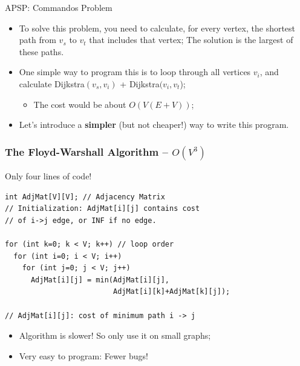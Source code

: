 \begin{frame}{APSP: Commandos Problem}
  \begin{itemize}
  \item To solve this problem, you need to calculate, for every vertex, the shortest path from $v_s$ to $v_t$ that includes that vertex; The solution is the largest of these paths.\bigskip

  \item One simple way to program this is to loop through all vertices $v_i$, and calculate Dijkstra$(v_s,v_i)$ + Dijkstra$(v_i,v_t$);
  \begin{itemize}
    \item The cost would be about $O(V(E+V))$;
  \end{itemize}\bigskip

  \item Let's introduce a {\bf simpler} (but not cheaper!) way to write this program.
  \end{itemize}
\end{frame}

\begin{frame}[fragile]
  \frametitle{The Floyd-Warshall Algorithm -- $O(V^3)$}

Only four lines of code!

  \begin{exampleblock}{}
\begin{verbatim}
int AdjMat[V][V]; // Adjacency Matrix
// Initialization: AdjMat[i][j] contains cost
// of i->j edge, or INF if no edge.

for (int k=0; k < V; k++) // loop order
  for (int i=0; i < V; i++)
    for (int j=0; j < V; j++)
      AdjMat[i][j] = min(AdjMat[i][j],
                         AdjMat[i][k]+AdjMat[k][j]);

// AdjMat[i][j]: cost of minimum path i -> j
\end{verbatim}
  \end{exampleblock}

  \begin{itemize}
  \item Algorithm is slower! So only use it on small graphs;
  \item Very easy to program: Fewer bugs!
  \end{itemize}
\end{frame}

